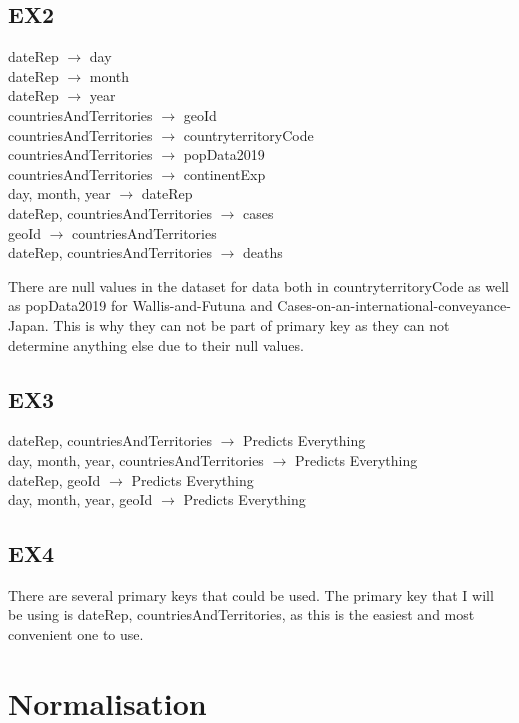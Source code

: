 \documentclass{article}
\begin{document}
\subsection{EX2}
dateRep $\rightarrow$ day \\
dateRep $\rightarrow$ month \\
dateRep $\rightarrow$ year \\
countriesAndTerritories $\rightarrow$ geoId \\
countriesAndTerritories $\rightarrow$ countryterritoryCode \\
countriesAndTerritories $\rightarrow$ popData2019 \\
countriesAndTerritories $\rightarrow$ continentExp \\
day, month, year $\rightarrow$ dateRep \\
dateRep, countriesAndTerritories $\rightarrow$ cases \\
geoId $\rightarrow$ countriesAndTerritories \\
dateRep, countriesAndTerritories $\rightarrow$ deaths 
\par
There are null values in the dataset for data both in countryterritoryCode as well as popData2019 for Wallis-and-Futuna and Cases-on-an-international-conveyance-Japan. This is why they can not be part of primary key as they can not determine anything else due to their null values.\par

\subsection{EX3}
dateRep, countriesAndTerritories $\rightarrow$ Predicts Everything \\
day, month, year, countriesAndTerritories $\rightarrow$ Predicts Everything \\
dateRep, geoId $\rightarrow$ Predicts Everything \\
day, month, year, geoId $\rightarrow$ Predicts Everything \\

\subsection{EX4}
There are several primary keys that could be used. The primary key that I will be using is dateRep, countriesAndTerritories, as this is the easiest and most convenient one to use.

\section{Normalisation}
\end{document}
